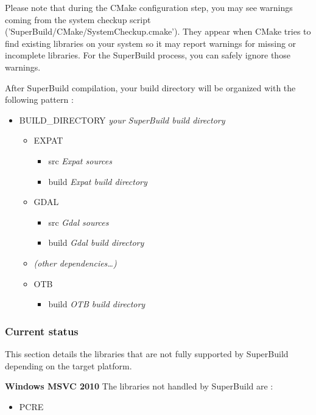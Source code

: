 Please note that during the CMake configuration step, you may see warnings coming from the system checkup script ('SuperBuild/CMake/SystemCheckup.cmake'). They appear when CMake tries to find existing libraries on your system so it may report warnings for missing or incomplete libraries. For the SuperBuild process, you can safely ignore those warnings.

After SuperBuild compilation, your build directory will be organized with the following pattern :
\begin{itemize}
  \item BUILD\_DIRECTORY \hfill \textit{your SuperBuild build directory}
  \begin{itemize}
    \item EXPAT
    \begin{itemize}
      \item src \hfill \textit{Expat sources}
      \item build \hfill \textit{Expat build directory}
    \end{itemize}
    \item GDAL
    \begin{itemize}
      \item src \hfill \textit{Gdal sources}
      \item build \hfill \textit{Gdal build directory}
    \end{itemize}
    \item \textit{(other dependencies\ldots)}
    \item OTB
    \begin{itemize}
      \item build \hfill \textit{OTB build directory}
    \end{itemize}
  \end{itemize}
\end{itemize}

\subsubsection{Current status}

This section details the libraries that are not fully supported by SuperBuild depending on the target platform. 

\textbf{Windows MSVC 2010}
\newline
The libraries not handled by SuperBuild are : 
\begin{itemize}
	\item PCRE
\end{itemize}


